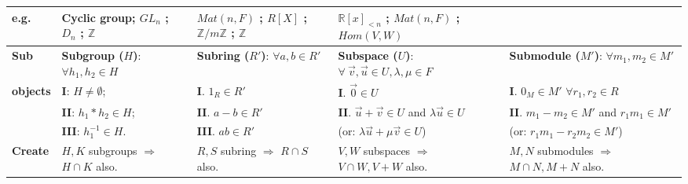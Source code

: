 \documentclass[9pt]{article}
\begin{document}
{\begin{longtable}{l@{\hskip 2pt}||l|l|l|l}
    \hline
    \textbf{\tiny e.g.}  & Cyclic group; $GL_n$ ; $D_n$ ; $\mathbb{Z}$                                   & $Mat(n,F)$ ; $R[X]$ ; $\mathbb{Z}/m\mathbb{Z}$ ; $\mathbb{Z}$                      & $\mathbb{R}[x]_{<n}$ ; $Mat(n,F)$ ; $Hom(V,W)$                                                                             &                                                                                           \\
    \hline
    \hline
    \textbf{\tiny Sub}     & \textbf{Subgroup ($H$)}: \hfill{\tiny $\forall h_1,h_2\in H$}               & \textbf{Subring ($R'$)}: \hfill{\tiny $\forall a,b\in R'$}                         & \textbf{Subspace ($U$)}: \hfill{\tiny $\forall \ \vec{v},\vec{u}\in U,\lambda,\mu\in F$}                                   & \textbf{Submodule ($M'$)}: \hfill{\tiny $\forall m_1,m_2\in M'$}                          \\
    \textbf{\tiny objects} & \textbf{I}: $H\ne\emptyset$;                                                & \textbf{I}. $1_R\in R'$                                                            & \textbf{I}. $\vec{0}\in U$                                                                                                 & \textbf{I}. $0_M\in M'$ \hfill{\tiny $\forall r_1,r_2\in R$}                              \\
                           & \textbf{II}: $h_1*h_2\in H$;                                                & \textbf{II}. $a-b\in R'$                                                           & \textbf{II}. $\vec{u}+\vec{v}\in U$ and $\lambda\vec{u}\in U$                                                              & \textbf{II}. $m_1-m_2\in M'$ and $r_1m_1\in M'$                                           \\
                           & \textbf{III}: $h_1^{-1}\in H$.                                              & \textbf{III}. $ab\in R'$                                                           & \qquad \quad (or: $\lambda\vec{u}+\mu\vec{v}\in U$)                                                                        & \qquad \quad (or: $r_1m_1-r_2m_2\in M'$)                                                  \\
    \hline
    \textbf{\tiny Create}  & $H,K$ subgroups $\Rightarrow$ $H\cap K$ also.                               & $R,S$ subring $\Rightarrow$ $R\cap S$ also.                                        & $V,W$ subspaces $\Rightarrow$ $V\cap W,V+W$ also.                                                                          & $M,N$ submodules $\Rightarrow$ $M\cap N,M+N$ also.\\

\end{longtable}}
\end{document}
